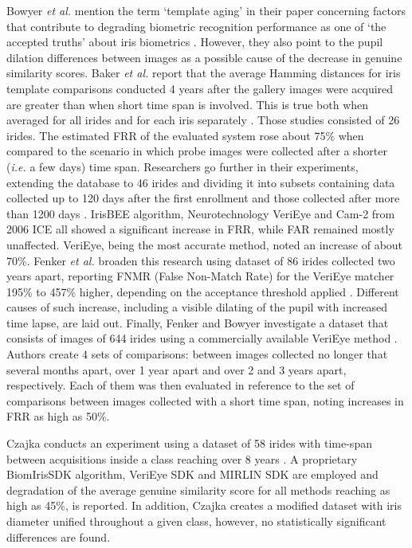 \documentclass{article}
\begin{document}
Bowyer \emph{et al.} mention the term `template aging' in their paper concerning factors that contribute to degrading biometric recognition performance as one of `the accepted truths' about iris biometrics \cite{kevin2009factors}. However, they also point to the pupil dilation differences between images as a possible cause of the decrease in genuine similarity scores. Baker \emph{et al.} report that the average Hamming distances for iris template comparisons conducted 4 years after the gallery images were acquired are greater than when short time span is involved. This is true both when averaged for all irides and for each iris separately \cite{Baker2009}. Those studies consisted of 26 irides. The estimated FRR of the evaluated system rose about 75\% when compared to the scenario in which probe images were collected after a shorter (\emph{i.e.} a few days) time span. Researchers go further in their experiments, extending the database to 46 irides and dividing it into subsets containing data collected up to 120 days after the first enrollment and those collected after more than 1200 days \cite{Baker2013}. IrisBEE algorithm, Neurotechnology VeriEye and Cam-2 from 2006 ICE all showed a significant increase in FRR, while FAR remained mostly unaffected. VeriEye, being the most accurate method, noted an increase of about 70\%. Fenker \emph{et al.} broaden this research using dataset of 86 irides collected two years apart, reporting FNMR (False Non-Match Rate) for the VeriEye matcher 195\% to 457\% higher, depending on the acceptance threshold applied \cite{Fenker2011}. Different causes of such increase, including a visible dilating of the pupil with increased time lapse, are laid out. Finally, Fenker and Bowyer investigate a dataset that consists of images of 644 irides using a commercially available VeriEye method \cite{Fenker2012}. Authors create 4 sets of comparisons: between images collected no longer that several months apart, over 1 year apart and over 2 and 3 years apart, respectively. Each of them was then evaluated in reference to the set of comparisons between images collected with a short time span, noting increases in FRR as high as 50\%.

Czajka conducts an experiment using a dataset of 58 irides with time-span between acquisitions inside a class reaching over 8 years \cite{Czajka2013}. A proprietary BiomIrisSDK algorithm, VeriEye SDK and MIRLIN SDK are employed and degradation of the average genuine similarity score for all methods reaching as high as 45\%, is reported. In addition, Czajka creates a modified dataset with iris diameter unified throughout a given class, however, no statistically significant differences are found.
\end{document}

